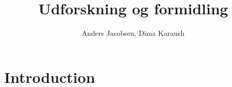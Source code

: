 \documentclass{article}
\author{Anders Jacobsen, Dima Karaush}
\title{Udforskning og formidling}
\begin{document}
\maketitle

\tableofcontents

\section{Introduction}
\end{document}
